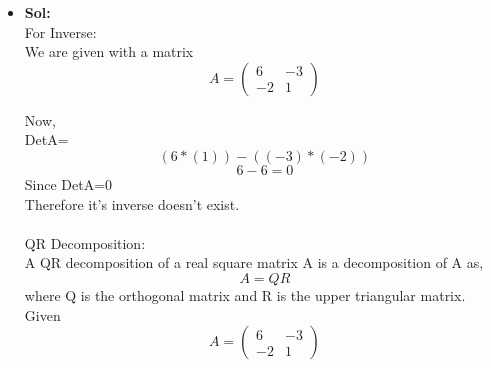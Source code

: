 \documentclass{article}
\begin{document}
\begin{itemize}
\[\[
\begin{pmatrix}
2 & -6\\
1 & -2
\end{pmatrix}
=
\begin{pmatrix}
2/\sqrt{5} & -1/\sqrt{5}\\
1/\sqrt{5} &  2/\sqrt{5}
\end{pmatrix}
*
\begin{pmatrix}
\sqrt{5} & -14/\sqrt{5}\\
0 & 2/\sqrt{5}
\end{pmatrix}
\]\\
\\
\\
\\
\\
\\
\\

\newpage
\textbf{(b)}
\[
A=
\begin{pmatrix}
6 & -3\\
-2 & 1
\end{pmatrix}
\]

\item{\textbf{Sol:}}\\

For Inverse:\\

We are given with a matrix 
\[
A=
\begin{pmatrix}
6 & -3\\
-2 & 1
\end{pmatrix}
\]

Now,\\

DetA=
 $$
 (6*(1)) - ((-3)*(-2))$$
 $$
 6 - 6=0
 $$
Since DetA=0\\
Therefore it's inverse doesn't exist.\\
\\


QR Decomposition:\\

A QR decomposition of a real square matrix A is a decomposition of A as,\\

$$ A=QR$$
 where Q is the orthogonal matrix and R is the upper triangular matrix.\\
 
 Given\\
 \[
A=
\begin{pmatrix}
6 & -3\\
-2 & 1
\end{pmatrix}
\]

\]
\end{itemize}
\end{document}

